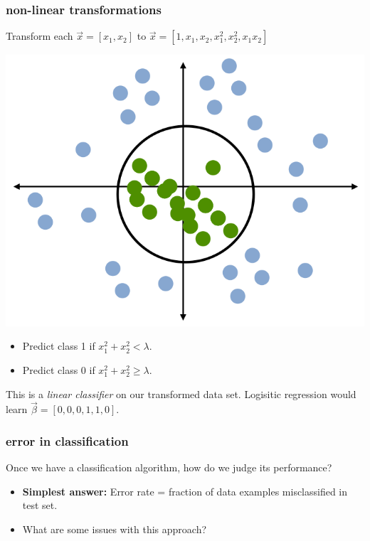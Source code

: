 \documentclass[handout,compress]{beamer}
\begin{document}
\begin{frame}
	\frametitle{non-linear transformations}
	Transform each $\vec{x} = [x_1,x_2]$ to $\vec{x} = [1, x_1,x_2, x_1^2, x_2^2, x_1x_2]$
	\begin{center}
		\includegraphics[width=.5\textwidth]{circle.png}
	\end{center}
	\begin{itemize}
		\item Predict class 1 if $x_1^2 + x_2^2 < \lambda$.
		\item Predict class 0 if $x_1^2 + x_2^2 \geq \lambda$.
	\end{itemize}
This is a \emph{linear classifier} on our transformed data set. Logisitic regression would learn $\vec{\beta} = [0,0,0,1,1,0]$.
\end{frame}

\begin{frame}
	\frametitle{error in classification}
	Once we have a classification algorithm, how do we judge its performance?
	\begin{itemize}
		\item \textbf{Simplest answer:} Error rate = fraction of data examples misclassified in test set.
		\item What are some issues with this approach?
	\end{itemize}
\end{frame}
\end{document}
